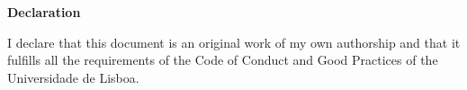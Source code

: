 \textbf{\Large Declaration}

I declare that this document is an original work of my own authorship and that
it fulfills all the requirements of the Code of Conduct and Good Practices of
the Universidade de Lisboa.
